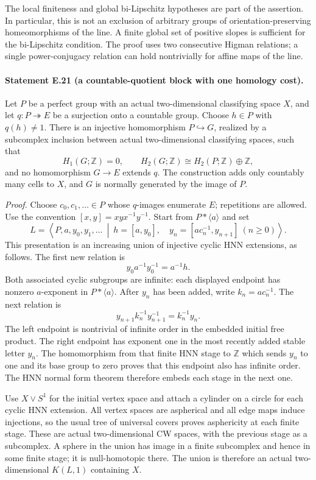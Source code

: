The local finiteness and global bi-Lipschitz hypotheses are part
of the assertion. In particular, this is not an exclusion of
arbitrary groups of orientation-preserving homeomorphisms of the
line. A finite global set of positive slopes is sufficient for the
bi-Lipschitz condition. The proof uses two consecutive Higman
relations; a single power-conjugacy relation can hold nontrivially
for affine maps of the line.

\paragraph{Statement E.21 (a countable-quotient block with one homology cost).}
Let $P$ be a perfect group with an actual two-dimensional
classifying space $X$, and let $q:P\twoheadrightarrow E$ be a
surjection onto a countable group. Choose $h\in P$ with $q(h)\ne1$.
There is an injective homomorphism $P\hookrightarrow G$, realized
by a subcomplex inclusion between actual two-dimensional
classifying spaces, such that
\[
 H_1(G;\mathbb Z)=0,\qquad
 H_2(G;\mathbb Z)\cong H_2(P;\mathbb Z)\oplus\mathbb Z,
 \tag{E.21.1}
\]
and no homomorphism $G\to E$ extends $q$. The construction adds
only countably many cells to $X$, and $G$ is normally generated
by the image of $P$.

\emph{Proof.}
Choose $c_0,c_1,\ldots\in P$ whose $q$-images enumerate $E$;
repetitions are allowed. Use the convention $[x,y]=xyx^{-1}y^{-1}$.
Start from $P*\langle a\rangle$ and set
\[
 L=\left\langle P,a,y_0,y_1,\ldots\ \middle|\
 h=[a,y_0],\quad
 y_n=[a c_n^{-1},y_{n+1}]\ (n\ge0)\right\rangle.
 \tag{E.21.2}
\]
This presentation is an increasing union of injective cyclic HNN
extensions, as follows. The first new relation is
\[
 y_0 a^{-1}y_0^{-1}=a^{-1}h.
\]
Both associated cyclic subgroups are infinite: each displayed
endpoint has nonzero $a$-exponent in $P*\langle a\rangle$.
After $y_n$ has been added, write $k_n=a c_n^{-1}$. The next
relation is
\[
 y_{n+1}k_n^{-1}y_{n+1}^{-1}=k_n^{-1}y_n.
\]
The left endpoint is nontrivial of infinite order in the embedded
initial free product. The right endpoint has exponent one in the
most recently added stable letter $y_n$. The homomorphism from
that finite HNN stage to $\mathbb Z$ which sends $y_n$ to one and
its base group to zero proves that this endpoint also has infinite
order. The HNN normal form theorem therefore embeds each stage
in the next one.

Use $X\vee S^1$ for the initial vertex space and attach a cylinder
on a circle for each cyclic HNN extension. All vertex spaces are
aspherical and all edge maps induce injections, so the usual tree
of universal covers proves asphericity at each finite stage.
These are actual two-dimensional CW spaces, with the previous
stage as a subcomplex. A sphere in the union has image in a finite
subcomplex and hence in some finite stage; it is null-homotopic
there. The union is therefore an actual two-dimensional $K(L,1)$
containing $X$.

